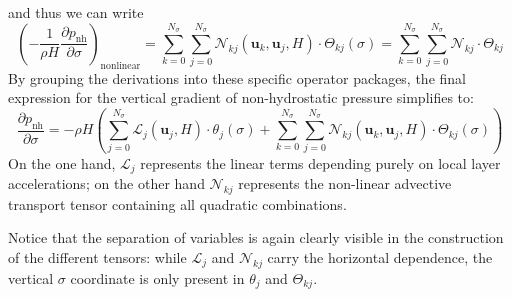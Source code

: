 \documentclass{article}
\newcommand{\Ns}{N_\sigma}
\newcommand{\uj}{\mathbf{u}_j}
\newcommand{\uk}{\mathbf{u}_k}
\newcommand{\sumj}{\sum_{j=0}^{\Ns}}
\newcommand{\sumk}{\sum_{k=0}^{\Ns}}
\newcommand{\pnh}{p_{\text{nh}}}
\newcommand{\dds}[1]{\frac{\partial #1}{\partial \sigma}}
\begin{document}
and thus we can write 
$$\left(-\frac{1}{\rho H}\dds{\pnh} \right)_{\text{nonlinear}} = \sumk \sumj \mathcal{N}_{kj}(\uk, \uj, H) \cdot \Theta_{kj}(\sigma) = \sumk \sumj \mathcal{N}_{kj}\cdot \Theta_{kj} $$
By grouping the derivations into these specific operator packages, the final expression for the vertical gradient of non-hydrostatic pressure simplifies to:
\begin{equation}
    \dds{\pnh} = -\rho H \left( \sumj \mathcal{L}_j(\uj, H) \cdot \theta_j(\sigma)  + \sumk \sumj \mathcal{N}_{kj}(\uk, \uj, H) \cdot \Theta_{kj}(\sigma) \right)    
    \label{eq: simplified nh pressure derivative}
\end{equation}
On the one hand, $\mathcal{L}_j$ represents the linear terms depending purely on local layer accelerations; on the other hand $\mathcal{N}_{kj}$ represents the non-linear advective transport tensor containing all quadratic combinations.

Notice that the separation of variables is again clearly visible in the construction of the different tensors: while $\mathcal{L}_j$ and $\mathcal{N}_{kj}$ carry the horizontal dependence, the vertical $\sigma$ coordinate is only present in $\theta_j$ and $\Theta_{kj}$. \\
\end{document}

